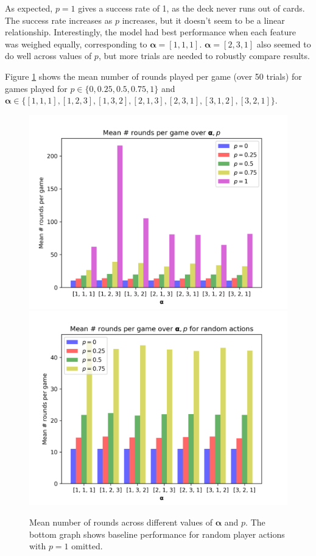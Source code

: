 \documentclass[11pt]{article}
\begin{document}
As expected, $p=1$ gives a success rate of 1, as the deck never runs out of cards. The success rate increases as $p$ increases, but it doesn't seem to be a linear relationship. Interestingly, the model had best performance when each feature was weighed equally, corresponding to $\bm{\alpha} = [1,1,1]$. $\bm{\alpha} = [2,3,1]$ also seemed to do well across values of $p$, but more trials are needed to robustly compare results.

Figure \ref{fig:rounds} shows the mean number of rounds played per game (over 50 trials) for games played for $p \in \{0, 0.25, 0.5, 0.75, 1\}$ and $\bm{\alpha} \in \{[1,1,1], [1,2,3], [1,3,2], [2,1,3], [2,3,1], [3,1,2], [3,2,1]\}$.

\begin{figure}[hpt]
  \centering
  \captionsetup{justification=centering,margin=2cm}
  \includegraphics[scale=0.8]{../plots/roundsAlphaP.png}
  \includegraphics[scale=0.8]{../plots/roundsAlphaP_RANDOM.png}
  \caption{Mean number of rounds across different values of $\bm{\alpha}$ and $p$. The bottom graph shows baseline performance for random player actions with $p=1$ omitted.}
  \label{fig:rounds}
\end{figure}
\end{document}
